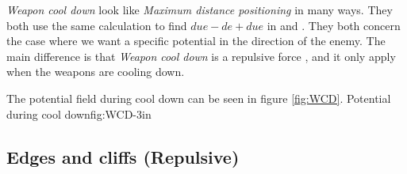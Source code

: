 {	\textit{Weapon cool down} look like \textit{Maximum distance positioning} in many ways. They both use the same calculation to find $due - de + due$ in  and .
	They both concern the case where we want a specific potential in the direction of the enemy. The main difference is that \textit{Weapon cool down} is a repulsive force , and it only apply when the weapons are cooling down.
	
	The potential field during cool down can be seen in figure \ref{fig:WCD}.
			{Potential during cool down}{fig:WCD}{-3in}
	\subsection{Edges and cliffs (Repulsive)}}